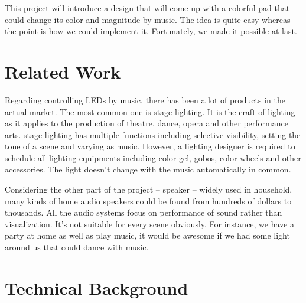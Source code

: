 \documentclass[12pt,a4paper,journal]{IEEEtran}
\begin{document}
This project will introduce a design that will come up with a colorful pad that could change its color and magnitude by music. The idea is quite easy whereas the point is how we could implement it. Fortunately, we made it possible at last.

\section{Related Work}

Regarding controlling LEDs by music, there has been a lot of products in the actual market. The most common one is stage lighting. It is the craft of lighting as it applies to the production of theatre, dance, opera and other performance arts. stage lighting has multiple functions including selective visibility, setting the tone of a scene and varying as music.  However, a lighting designer is required to schedule all lighting equipments including color gel, gobos, color wheels and other accessories. The light doesn't change with the music automatically in common. 

Considering the other part of the project -- speaker -- widely used in household, many kinds of home audio speakers could be found from hundreds of dollars to thousands. All the audio systems focus on performance of sound rather than visualization. It's not suitable for every scene obviously. For instance, we have a party at home as well as play music, it would be awesome if we had some light around us that could dance with music.

\section{Technical Background}
\end{document}
